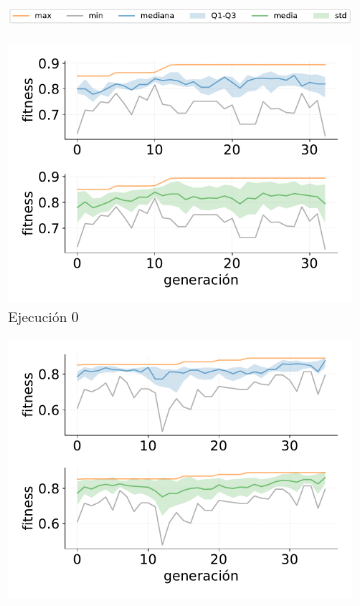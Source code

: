 \begin{figure}[p]
\centering
    \begin{subfigure}{1\textwidth}
        \centering
        \includegraphics[width=\textwidth]{figuras/experimentos/exp_no_elitismo/legend.pdf}
    \end{subfigure}
    \begin{subfigure}{0.47\textwidth}
        \centering
        \includegraphics[width=\textwidth]{figuras/experimentos/exp9/ind_0.pdf}
        \caption{Ejecución 0}
    \end{subfigure}
    \hfill
    \begin{subfigure}{0.47\textwidth}
        \centering
        \includegraphics[width=\textwidth]{figuras/experimentos/exp9/ind_1.pdf}

\end{subfigure}
\end{figure}
